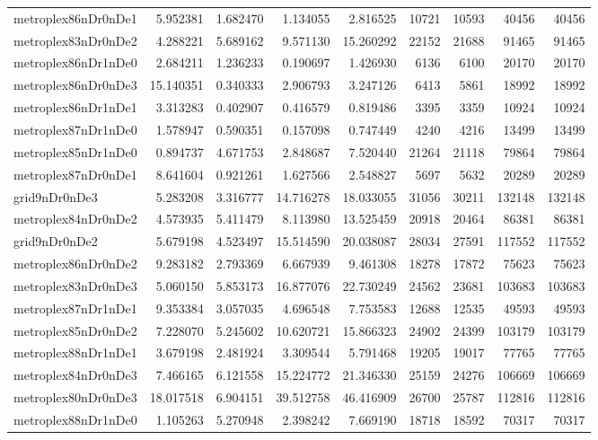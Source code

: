 \begin{longtable}{|l|r|r|r|r|r|r|r|r|}
metroplex86nDr0nDe1 & 5.952381 & 1.682470 & 1.134055 & 2.816525 & 10721 & 10593 & 40456 & 40456 \\
metroplex83nDr0nDe2 & 4.288221 & 5.689162 & 9.571130 & 15.260292 & 22152 & 21688 & 91465 & 91465 \\
metroplex86nDr1nDe0 & 2.684211 & 1.236233 & 0.190697 & 1.426930 & 6136 & 6100 & 20170 & 20170 \\
metroplex86nDr0nDe3 & 15.140351 & 0.340333 & 2.906793 & 3.247126 & 6413 & 5861 & 18992 & 18992 \\
metroplex86nDr1nDe1 & 3.313283 & 0.402907 & 0.416579 & 0.819486 & 3395 & 3359 & 10924 & 10924 \\
metroplex87nDr1nDe0 & 1.578947 & 0.590351 & 0.157098 & 0.747449 & 4240 & 4216 & 13499 & 13499 \\
metroplex85nDr1nDe0 & 0.894737 & 4.671753 & 2.848687 & 7.520440 & 21264 & 21118 & 79864 & 79864 \\
metroplex87nDr0nDe1 & 8.641604 & 0.921261 & 1.627566 & 2.548827 & 5697 & 5632 & 20289 & 20289 \\
grid9nDr0nDe3 & 5.283208 & 3.316777 & 14.716278 & 18.033055 & 31056 & 30211 & 132148 & 132148 \\
metroplex84nDr0nDe2 & 4.573935 & 5.411479 & 8.113980 & 13.525459 & 20918 & 20464 & 86381 & 86381 \\
grid9nDr0nDe2 & 5.679198 & 4.523497 & 15.514590 & 20.038087 & 28034 & 27591 & 117552 & 117552 \\
metroplex86nDr0nDe2 & 9.283182 & 2.793369 & 6.667939 & 9.461308 & 18278 & 17872 & 75623 & 75623 \\
metroplex83nDr0nDe3 & 5.060150 & 5.853173 & 16.877076 & 22.730249 & 24562 & 23681 & 103683 & 103683 \\
metroplex87nDr1nDe1 & 9.353384 & 3.057035 & 4.696548 & 7.753583 & 12688 & 12535 & 49593 & 49593 \\
metroplex85nDr0nDe2 & 7.228070 & 5.245602 & 10.620721 & 15.866323 & 24902 & 24399 & 103179 & 103179 \\
metroplex88nDr1nDe1 & 3.679198 & 2.481924 & 3.309544 & 5.791468 & 19205 & 19017 & 77765 & 77765 \\
metroplex84nDr0nDe3 & 7.466165 & 6.121558 & 15.224772 & 21.346330 & 25159 & 24276 & 106669 & 106669 \\
metroplex80nDr0nDe3 & 18.017518 & 6.904151 & 39.512758 & 46.416909 & 26700 & 25787 & 112816 & 112816 \\
metroplex88nDr1nDe0 & 1.105263 & 5.270948 & 2.398242 & 7.669190 & 18718 & 18592 & 70317 & 70317 \\

\end{longtable}
